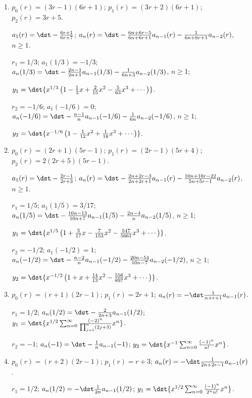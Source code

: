 \documentclass[openany]{book}
\newenvironment{sectionSolutions}{
 \begin{enumerate}[item-label={\thesection.\arabic{enumi}.}]
}{
 \end{enumerate}
}
\begin{document}
\begin{sectionSolutions}
$y_2=\dst{x-\frac{1}{4}x^2-\frac{35}{18}x^3+\frac{11}{12}x^4+\cdots}$.


\item
$p_0(r)=(3r-1)(6r+1)$;
$p_1(r)=(3r+2)(6r+1)$;
$p_2(r)=3r+5$.

$a_1(r)=\dst-\frac{6r+1}{6r+7}$;
$a_n(r)=\dst-\frac{6n+6r-5}{6n+6r+1}a_{n-1}(r)-\frac{1}{6n+6r+1}a_{n-2}(r)$,
$n\ge1$.

$r_1=1/3$;
$a_1(1/3)=-1/3$;
$a_n(1/3)=\dst-\frac{2n-1}{2n+1}a_{n-1}(1/3)-\frac{1}{6n+3}a_{n-2}(1/3)$,
$n\ge$1;

$y_1=\dst{x^{1/3}\left(1-\frac{1}{3}x+\frac{2}{15}x^2-
\frac{5}{63}x^3+\cdots\right)}$.


$r_2=-1/6$;
$a_1(-1/6)=0$;
$a_n(-1/6)=\dst-\frac{n-1}{ n}a_{n-1}(-1/6)-\frac{1}{6n}a_{n-2}(-1/6)$,
$n\ge1$;

$y_2=\dst{x^{-1/6}\left(1-\frac{1}{12}x^2+\frac{1}{18}x^3+\cdots\right)}$.


\item
$p_0(r)=(2r+1)(5r-1)$;
$p_1(r)=(2r-1)(5r+4)$;
$p_2(r)=2(2r+5)(5r-1)$.

$a_1(r)=\dst-\frac{2r-1}{2r+3}$;
$a_n(r)=\dst-\frac{2n+2r-3}{2n+2r+1}a_{n-1}(r)-
\frac{10n+10r-22}{5n+5r-1}a_{n-2}(r)$,
$n\ge1$.

$r_1=1/5$;
$a_1(1/5)=3/17$;
$a_n(1/5)=\dst-\frac{10n-13}{10n+7}a_{n-1}(1/5)-\frac{2n-4}{ n}a_{n-2}(1/5)$,
$n\ge$1;


$y_1=\dst{x^{1/5}\left(1+\frac{3}{17}x-\frac{7}{153}x^2-
\frac{547}{5661}x^3+\cdots\right)}$.

$r_2=-1/2$;
$a_1(-1/2)=1$;
$a_n(-1/2)=\dst-\frac{n-2}{ n}a_{n-1}(-1/2)-\frac{20n-54}{10n-7}a_{n-2}(-1/2)$,
$n\ge1$;

$y_2=\dst{x^{-1/2}\left(1+x+\frac{14}{13}x^2-\frac{556}{897}x^3+\cdots\right)}$.

\addtocounter{enumi}{2}
\item%
$p_0(r)=(r+1)(2r-1)$;
$p_1(r)=2r+1$;
$a_n(r)=-\dst\frac{1}{ n+r+1}a_{n-1}(r)$.

$r_1=1/2$; $a_n(1/2)=\dst-\frac{2}{ 2n+3}a_{n-1}(1/2)$;
$y_1=\dst{x^{1/2}\sum_{n=0}^\infty\frac{(-2)^n}{\prod_{j=1}^n(2j+3)}x^n}$.

$r_2=-1$; $a_n(-1)=\dst-\frac{1}{ n}a_{n-1}(-1)$;
$y_2=\dst{x^{-1}\sum_{n=0}^\infty\frac{(-1)^n}{ n!}x^n}$.


\item
$p_0(r)=(r+2)(2r-1)$;
$p_1(r)=r+3$;
$a_n(r)=-\dst\frac{1}{ 2n+2r-1}a_{n-1}(r)$.

$r_1=1/2$;
$a_n(1/2)= -\dst\frac{1}{ 2n}a_{n-1}(1/2)$;
$y_1=\dst{x^{1/2}\sum_{n=0}^\infty \frac{(-1)^n}{2^nn!}x^n}$.



\end{sectionSolutions}
\end{document}
